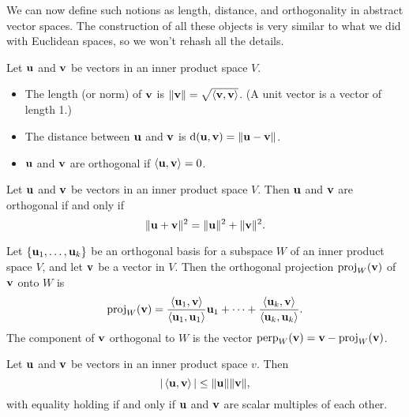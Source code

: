 \documentclass[../m073main.tex]{subfiles}
\begin{document}
We can now define such notions as length, distance, and orthogonality in abstract vector spaces.
The construction of all these objects is very similar to what we did with Euclidean spaces, so we won't rehash all the details.

\begin{definition}
	Let $\mathbf{u}$ and $\mathbf{v}$ be vectors in an inner product space $V$.
	\begin{itemize}[topsep=0pt]
		\item The length (or norm) of $\mathbf{v}$ is $\|\mathbf{v}\| = \sqrt{\left< \mathbf{v}, \mathbf{v} \right>}$.
		(A unit vector is a vector of length 1.)
		\item The distance between $\mathbf{u}$ and $\mathbf{v}$ is $\textrm{d}(\mathbf{u}, \mathbf{v}) = \|\mathbf{u} - \mathbf{v}\|$.
		\item $\mathbf{u}$ and $\mathbf{v}$ are orthogonal if $\left< \mathbf{u}, \mathbf{v} \right> = 0$.
	\end{itemize}
\end{definition}

\begin{theorem}
	Let $\mathbf{u}$ and $\mathbf{v}$ be vectors in an inner product space $V$.
	Then $\mathbf{u}$ and $\mathbf{v}$ are orthogonal if and only if
	\[ \|\mathbf{u} + \mathbf{v}\|^2 = \|\mathbf{u}\|^2 + \|\mathbf{v}\|^2. \]
\end{theorem}

\begin{definition}
	Let $\{\mathbf{u}_1, \ldots, \mathbf{u}_k\}$ be an orthogonal basis for a subspace $W$ of an inner product space $V$, and let $\mathbf{v}$ be a vector in $V$.
	Then the orthogonal projection $\textrm{proj}_W(\mathbf{v})$ of $\mathbf{v}$ onto $W$ is
	\[ \textrm{proj}_W(\mathbf{v}) = \frac{\left< \mathbf{u}_1, \mathbf{v} \right>}{\left< \mathbf{u}_1, \mathbf{u}_1 \right>} \mathbf{u}_1 + \cdots + \frac{\left< \mathbf{u}_k, \mathbf{v} \right>}{\left< \mathbf{u}_k, \mathbf{u}_k \right>}. \]
	The component of $\mathbf{v}$ orthogonal to $W$ is the vector $\textrm{perp}_W(\mathbf{v}) = \mathbf{v} - \textrm{proj}_W(\mathbf{v})$.
\end{definition}

\begin{theorem}
	Let $\mathbf{u}$ and $\mathbf{v}$ be vectors in an inner product space $v$.
	Then
	\[ |\left< \mathbf{u}, \mathbf{v} \right>| \leq \|\mathbf{u}\| \|\mathbf{v}\|, \]
	with equality holding if and only if $\mathbf{u}$ and $\mathbf{v}$ are scalar multiples of each other.
\end{theorem}
\end{document}

